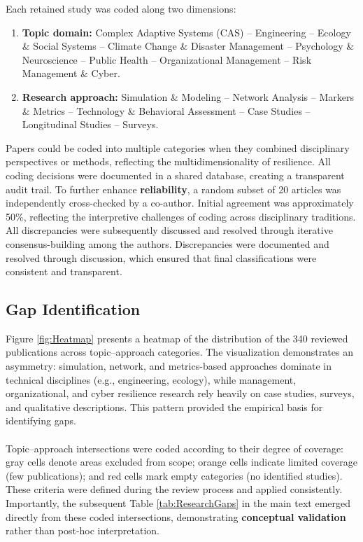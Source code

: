 Each retained study was coded along two dimensions:  

\begin{enumerate}
    \item \textbf{Topic domain:} Complex Adaptive Systems (CAS) -- Engineering -- Ecology \& Social Systems -- Climate Change \& Disaster Management -- Psychology \& Neuroscience -- Public Health -- Organizational Management -- Risk Management \& Cyber.  
    \item \textbf{Research approach:} Simulation \& Modeling -- Network Analysis -- Markers \& Metrics -- Technology \& Behavioral Assessment -- Case Studies -- Longitudinal Studies -- Surveys.\\  
\end{enumerate}

Papers could be coded into multiple categories when they combined disciplinary perspectives or methods, reflecting the multidimensionality of resilience. All coding decisions were documented in a shared database, creating a transparent audit trail. To further enhance \textbf{reliability}, a random subset of 20 articles was independently cross-checked by a co-author. Initial agreement was approximately 50\%, reflecting the interpretive challenges of coding across disciplinary traditions. All discrepancies were subsequently discussed and resolved through iterative consensus-building among the authors. Discrepancies were documented and resolved through discussion, which ensured that final classifications were consistent and transparent.  

\subsection{Gap Identification}

Figure \ref{fig:Heatmap} presents a heatmap of the distribution of the 340 reviewed publications across topic–approach categories. The visualization demonstrates an asymmetry: simulation, network, and metrics-based approaches dominate in technical disciplines (e.g., engineering, ecology), while management, organizational, and cyber resilience research rely heavily on case studies, surveys, and qualitative descriptions. This pattern provided the empirical basis for identifying gaps.\\  
\\
Topic–approach intersections were coded according to their degree of coverage: gray cells denote areas excluded from scope; orange cells indicate limited coverage (few publications); and red cells mark empty categories (no identified studies). These criteria were defined during the review process and applied consistently. Importantly, the subsequent Table \ref{tab:ResearchGaps} in the main text emerged directly from these coded intersections, demonstrating \textbf{conceptual validation} rather than post-hoc interpretation. 

